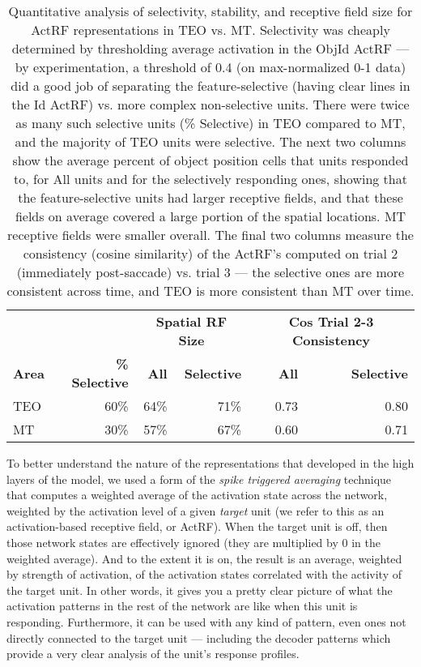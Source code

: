 \documentclass[11pt,twoside]{article}
\newif\myifpdf
\begin{document}
\begin{table}
  \centering
  \begin{tabular}{l|rrrrr}
    & & \multicolumn{2}{c}{{\bf Spatial RF Size}} &
    \multicolumn{2}{c}{{\bf Cos Trial 2-3 Consistency}} \\
    {\bf Area} & {\bf \% Selective} & {\bf All} & {\bf Selective}  & {\bf All} & {\bf Selective} \\ \hline
    TEO & 60\% & 64\% & 71\% & 0.73 & 0.80 \\
    MT  & 30\% & 57\% & 67\% & 0.60 & 0.71 \\
  \end{tabular}
  \caption{\footnotesize Quantitative analysis of selectivity, stability, and receptive field size for ActRF representations in TEO vs. MT.  Selectivity was cheaply determined by thresholding average activation in the ObjId ActRF --- by experimentation, a threshold of 0.4 (on max-normalized 0-1 data) did a good job of separating the feature-selective (having clear lines in the Id ActRF) vs. more complex non-selective units.  There were twice as many such selective units (\% Selective) in TEO compared to MT, and the majority of TEO units were selective.  The next two columns show the average percent of object position cells that units responded to, for All units and for the selectively responding ones, showing that the feature-selective units had larger receptive fields, and that these fields on average covered a large portion of the spatial locations.  MT receptive fields were smaller overall.  The final two columns measure the consistency (cosine similarity) of the ActRF's computed on trial 2 (immediately post-saccade) vs. trial 3 --- the selective ones are more consistent across time, and TEO is more consistent than MT over time.}
  \label{tab.actrf_stats}
\end{table}

To better understand the nature of the representations that developed in the high layers of the model, we used a form of the {\em spike triggered averaging} technique that computes a weighted average of the activation state across the network, weighted by the activation level of a given {\em target} unit (we refer to this as an activation-based receptive field, or ActRF).  When the target unit is off, then those network states are effectively ignored (they are multiplied by 0 in the weighted average).  And to the extent it is on, the result is an average, weighted by strength of activation, of the activation states correlated with the activity of the target unit.  In other words, it gives you a pretty clear picture of what the activation patterns in the rest of the network are like when this unit is responding.  Furthermore, it can be used with any kind of pattern, even ones not directly connected to the target unit --- including the decoder patterns which provide a very clear analysis of the unit's response profiles.
\end{document}
